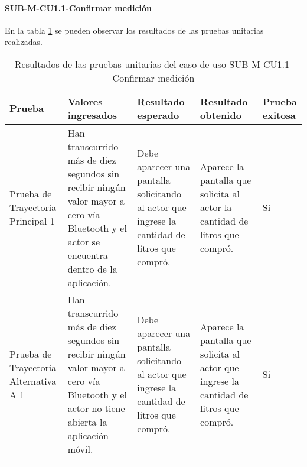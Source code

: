 \paragraph{SUB-M-CU1.1-Confirmar medición}\label{SUB-M-CU1.1:Pruebas}
En la tabla \ref{pruebas_unitarias_sub-m-cu1.1} se pueden observar los resultados de las pruebas unitarias realizadas.
\begin{longtable}{|M{2cm}| M{4.5cm}|M{3cm}|M{3cm}|M{1.5cm}|}
	\hline
	\textbf{Prueba} & \textbf{Valores ingresados} & \textbf{Resultado esperado} & \textbf{Resultado obtenido} & \textbf{Prueba exitosa} \\ \hline
	Prueba de Trayectoria Principal 1& Han transcurrido más de diez segundos sin recibir ningún valor mayor a cero vía Bluetooth y el actor se encuentra dentro de la aplicación.
	& Debe aparecer una pantalla solicitando al actor que ingrese la cantidad de litros que compró. & Aparece la pantalla que solicita al actor la cantidad de litros que compró. & Si \\ \hline
	Prueba de Trayectoria Alternativa A 1& Han transcurrido más de diez segundos sin recibir ningún valor mayor a cero vía Bluetooth y el actor no tiene abierta la aplicación móvil.
	& Debe aparecer una pantalla solicitando al actor que ingrese la cantidad de litros que compró. & Aparece la pantalla que solicita al actor que ingrese la cantidad de litros que compró. & Si \\ \hline
	\caption{Resultados de las pruebas unitarias del caso de uso SUB-M-CU1.1-Confirmar medición}
	\label{pruebas_unitarias_sub-m-cu1.1}
\end{longtable}
